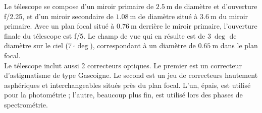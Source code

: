 \documentclass[11pt, twoside, a4paper, openright]{report}
\begin{document}
Le télescope se compose d'un miroir primaire de $\SI{2,5}{\meter}$ de diamètre et d'ouverture f/\num{2,25}, et d'un miroir secondaire de $\SI{1,08}{\meter}$ de diamètre situé à $\SI{3,6}{\meter}$ du miroir primaire. Avec un plan focal situé à $\SI{0,76}{\meter}$ derrière le miroir primaire, l'ouverture finale du télescope est f/5. Le champ de vue qui en résulte est de $\SI{3}{\deg}$ de diamètre sur le ciel ($\SI{7}{\square\deg}$), correspondant à un diamètre de $\SI{0,65}{\meter}$ dans le plan focal. \\
Le télescope inclut aussi 2 correcteurs optiques. Le premier est un correcteur d'astigmatisme de type Gascoigne. Le second est un jeu de correcteurs hautement asphériques et interchangeables situés près du plan focal. L'un, épais, est utilisé pour la photométrie ; l'autre, beaucoup plus fin, est utilisé lors des phases de spectrométrie.
\end{document}
